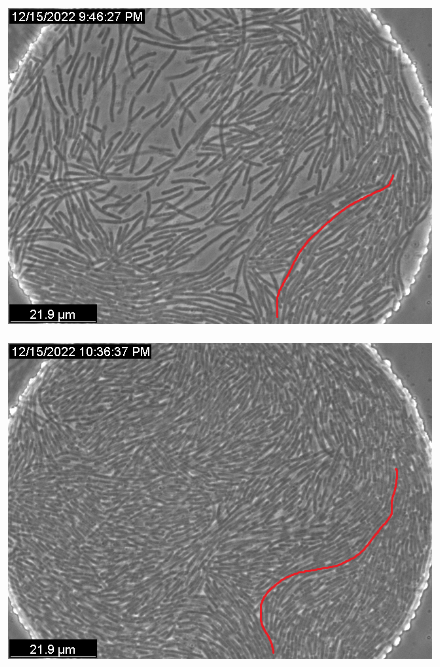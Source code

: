 \documentclass[a4paper,11pt,titlepage]{jsarticle}
\begin{document}
\begin{figure}[htbp]
  \centering
  \begin{minipage}{0.45\linewidth}
    \centering
    \includegraphics[width=\columnwidth]{Series015_t090000_ch00.png}
    \label{fig:06_1_pt}
  \end{minipage}
  \begin{minipage}{0.45\linewidth}
    \centering
    \includegraphics[width=\columnwidth]{Series015_t120000_ch00.png}
    \label{fig:06_2_pt}
  \end{minipage}
  \begin{minipage}{0.45\linewidth}
    \centering

\end{minipage}
\end{figure}
\end{document}

